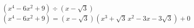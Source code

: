 {$\left(x^4-6x^2+9 \right) \div \left(x -\sqrt{3} \right)$}
{$\left(x^4-6x^2+9 \right) = \left(x -\sqrt{3} \right) \left(x^3+\sqrt{3} \,x^2-3x-3\sqrt{3}\right) + 0$}
